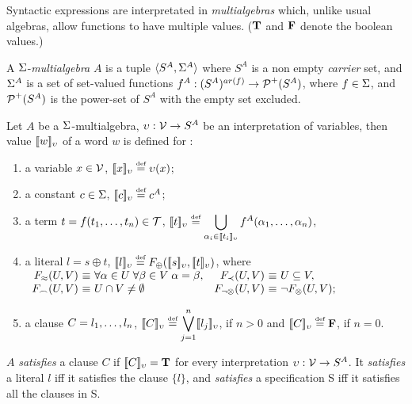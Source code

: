 %
Syntactic expressions are interpretated in {\em multialgebras}
\cite{Kap,Hus,Mich} which, unlike usual algebras, allow
functions to have multiple values.
(\(\true\) and  \(\false\) denote the boolean values.)
%
\begin{definition}
A $\Funcs$-{\em multialgebra} $A$ is a tuple \(\<S^A,\Funcs^A\>\) where
$S^A$ is a non empty {\em carrier} set, and $\Funcs^A$ is a set of
set-valued functions \(f^A: (S^A)^{ar(f)}\to\C P^+(S^A)\), where \(f\in
\Funcs\), and \(\C P^+(S^A)\) is the power-set of \(S^A\) with the empty set
excluded.
\end{definition}
%
\begin{definition} \label {def:semantics}
Let $A$ be a \(\Funcs\)-multialgebra, \(\upsilon:\Vars \to S^A\) be an
interpretation of variables, then value \(\Value w\) of a word $w$ is
defined for :
\begin{enumerate}\smallerspaces
\item a variable \(x\in\Vars\), \(\Value x \Def \upsilon(x)\);
  \label {semantics-v}
\item a constant $c\in\Funcs$, \(\Value c \Def c^A\);
\item a term \(t=f(\List tn,)\in \Terms\),  
  \(\displaystyle
  \Value t \Def \bigcup_{{\alpha_i} \in \Value{t_i}}
  f^A(\List{\alpha}n,)\), 
  \label {semantics1}
\item a literal \(l=s\oplus t\), \(\Value l \Def
  F_\oplus(\Value s, \Value t)\), where
  \vspace{1ex}\newline \(
  \begin{array}{r@{\ \equiv\ } l@{\quad}r@{\ \equiv\ } l}
      F_{\Eq}(U,V) & \forall \alpha\in U\; \forall \beta\in V\;\alpha=\beta, &
      F_{\Incl}(U,V) & U\subseteq V,\\
      F_{\Int}(U,V) & U\cap V\neq \es & %
      F_{\neg\otimes}(U,V) & \neg F_\otimes(U,V);
  \end{array}\)
  \label {semantics3}
\item a clause \(C=\List ln,\), \(\Value C \Def \displaystyle
  \bigvee_{j=1}^n \Value{l_j} \), if \(n>0\) and \(\Value C \Def \false\), if $n=0$.
  \label {semantics4}
\vspace{-1ex}
\end{enumerate}
\noindent
$A$ {\em satisfies} a clause $C$ if \(\Value C =
\true\) for every interpretation \(\upsilon:\Vars \to S^A\).
It {\em satisfies} a literal $l$ iff it satisfies the clause
\(\{ l\}\), and {\em satisfies} a specification \C S iff it satisfies all
the clauses in \C S.
\end{definition}
%
%
